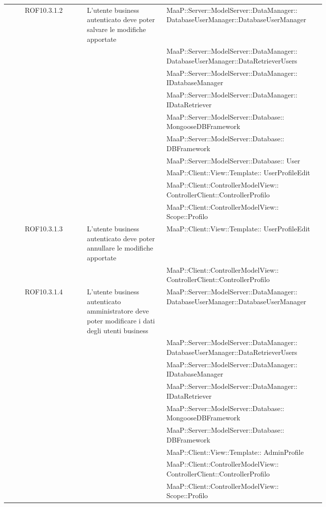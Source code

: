 \begin{center}
\begin{longtable}{|c|p{0.25\linewidth}|p{0.5\linewidth}|}
\midrule
ROF10.3.1.2
& L'utente business autenticato deve poter  salvare le modifiche apportate
& MaaP::Server::ModelServer::DataManager:: DatabaseUserManager::DatabaseUserManager\\
& & MaaP::Server::ModelServer::DataManager:: DatabaseUserManager::DataRetrieverUsers\\
& & MaaP::Server::ModelServer::DataManager:: IDatabaseManager\\
& & MaaP::Server::ModelServer::DataManager:: IDataRetriever\\
& & MaaP::Server::ModelServer::Database:: MongooseDBFramework\\
& & MaaP::Server::ModelServer::Database:: DBFramework\\
& & MaaP::Server::ModelServer::Database:: User\\
& & MaaP::Client::View::Template:: UserProfileEdit\\
& & MaaP::Client::ControllerModelView:: ControllerClient::ControllerProfilo\\
& & MaaP::Client::ControllerModelView:: Scope::Profilo\\

\midrule
ROF10.3.1.3
& L'utente business autenticato deve poter annullare le modifiche apportate
& MaaP::Client::View::Template:: UserProfileEdit\\
& & MaaP::Client::ControllerModelView:: ControllerClient::ControllerProfilo\\

\midrule
ROF10.3.1.4
& L'utente business autenticato amministratore deve poter modificare i dati degli utenti business
& MaaP::Server::ModelServer::DataManager:: DatabaseUserManager::DatabaseUserManager\\
& & MaaP::Server::ModelServer::DataManager:: DatabaseUserManager::DataRetrieverUsers\\
& & MaaP::Server::ModelServer::DataManager:: IDatabaseManager\\
& & MaaP::Server::ModelServer::DataManager:: IDataRetriever\\
& & MaaP::Server::ModelServer::Database:: MongooseDBFramework\\
& & MaaP::Server::ModelServer::Database:: DBFramework\\
& & MaaP::Client::View::Template:: AdminProfile\\
& & MaaP::Client::ControllerModelView:: ControllerClient::ControllerProfilo\\
& & MaaP::Client::ControllerModelView:: Scope::Profilo\\


\end{longtable}
\end{center}

